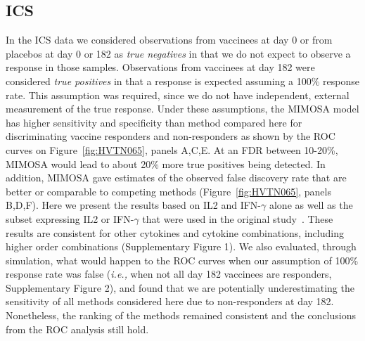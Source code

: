 \documentclass[12pt,oupdraft]{biostatistics}
\begin{document}
\subsection{ICS}
\label{s:ics}
In the ICS data we considered observations from vaccinees at day 0 or from placebos at day 0 or 182 as \emph{true negatives} in that we do not expect to observe a response in those samples. Observations from vaccinees at day 182 were considered \emph{true positives} in that a response is expected assuming a 100\% response rate. This assumption was required, since we do not have independent, external measurement of the true response. Under these assumptions, the MIMOSA model has higher sensitivity and specificity than method compared here for discriminating vaccine responders and non-responders  as shown by the ROC curves on Figure~\ref{fig:HVTN065}, panels A,C,E.
At an FDR between 10-20\%, MIMOSA would lead to about 20\% more true positives being detected.
In addition, MIMOSA gave estimates of the observed false discovery rate that are better or comparable to competing methods (Figure~\ref{fig:HVTN065}, panels B,D,F). Here we present the results based on IL2 and IFN-$\gamma$ alone as well as the subset expressing IL2 or IFN-$\gamma$ that were used in the original study~\citep{Goepfert:2011ci}. These results are consistent for other cytokines and cytokine combinations, including higher order combinations  (Supplementary Figure 1).  We also evaluated, through simulation, what would happen to the ROC curves when our assumption of 100\% response rate was false (\textit{i.e.,} when not all day 182 vaccinees are responders, Supplementary Figure 2), and found that we are potentially underestimating the sensitivity of all methods considered here due to non-responders at day 182. Nonetheless, the ranking of the methods remained consistent and the conclusions from the ROC analysis still hold.
\end{document}
